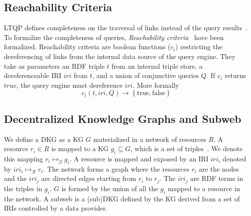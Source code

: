 \subsection{Reachability Criteria}

LTQP defines completeness on the traversal of links instead of the query results~\cite{Hartig2012}.
To formalize the completeness of queries, \emph{Reachability criteria}~\cite{Hartig2012} have been formalized.
Reachability criteria are boolean functions ($c_i$) restricting the dereferencing of links from the internal data source of the query engine.
They take as parameters an RDF triple $t$ from an internal triple store, a dereferenceable IRI $iri$ from $t$, and a union of conjunctive queries $Q$.
If $c_i$ returns $true$, the query engine must dereference $iri$.
More formally
\begin{equation}\label{eq:reachabilityCriteria}
c_i(t, iri, Q) \rightarrow \left\{ \mathrm{true}, \mathrm{false} \right\}
\end{equation}

\subsection{Decentralized Knowledge Graphs and Subweb}\label{sec:dkg}

We define a DKG as a KG $G$ materialized in a network of resources $R$.
A resource $r_i \in R$ is mapped to a KG $g_i \subseteq G$, which is a set of triples~\cite{w3ConceptsAbstract}.
We denote this mapping $r_i \mapsto_{\mathcal{G}} g_i$.
A resource is mapped and exposed by an IRI $iri_i$ denoted by $iri_i \mapsto_{\mathcal{R}} r_i$.
The network forms a graph where the resources $r_i$ are the nodes and the $iri_j$ are directed edges starting from $r_i$ to $r_j$.
The $iri_j$ are RDF terms in the triples in $g_i$.
$G$ is formed by the union of all the $g_i$ mapped to a resource in the network.
A subweb is a (sub)DKG defined by the KG derived from a set of IRIs controlled by a data provider.
